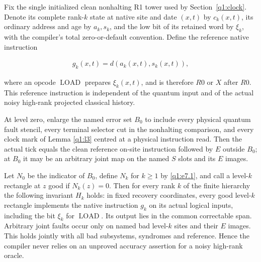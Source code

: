 \begin{lemma}\label{q1:l6}


Fix the single initialized clean nonhalting R1 tower used by Section~\ref{q1:clock}. Denote its complete rank-\(k\) state at native site and date \((x,t)\) by \(c_{k}(x,t)\), its ordinary address and age by \(a_{k},s_{k}\), and the low bit of its retained word by \(\xi_{k}\), with the compiler's total zero-or-default convention. Define the reference native instruction

\[
\begin{gathered}
g_{k}(x,t) = d(a_{k}(x,t),s_{k}(x,t)),
\end{gathered}
\]

where an opcode \(\operatorname{LOAD}\) prepares \(\xi_{k}(x,t)\), and is therefore \(R0\) or \(X\) after \(R0\). This reference instruction is independent of the quantum input and of the actual noisy high-rank projected classical history.

At level zero, enlarge the named error set \(B_{0}\) to include every physical quantum fault stencil, every terminal selector cut in the nonhalting comparison, and every clock mark of Lemma \ref{q1:l3} centred at a physical instruction read. Then the actual tick equals the clean reference on-site instruction followed by \(E\) outside \(B_{0}\); at \(B_{0}\) it may be an arbitrary joint map on the named \(S\) slots and its \(E\) images.

Let \(N_{0}\) be the indicator of \(B_{0}\), define \(N_{k}\) for \(k\ge1\) by \eqref{q1:e7.1}, and call a level-\(k\) rectangle at \(z\) good if \(N_{k}(z)=0\). Then for every rank \(k\) of the finite hierarchy the following invariant \(H_{k}\) holds: in fixed recovery coordinates, every good level-\(k\) rectangle implements the native instruction \(g_{k}\) on its actual logical inputs, including the bit \(\xi_{k}\) for \(\operatorname{LOAD}\). Its output lies in the common correctable span. Arbitrary joint faults occur only on named bad level-\(k\) sites and their \(E\) images. This holds jointly with all bad subsystems, syndromes and reference. Hence the compiler never relies on an unproved accuracy assertion for a noisy high-rank oracle.

\end{lemma}
